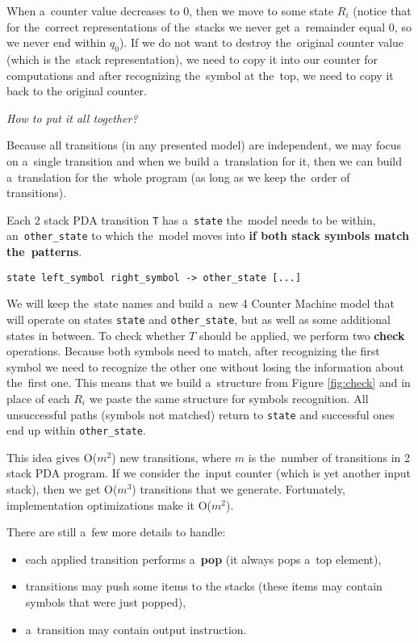 \documentclass[english,shortabstract,mgr]{iithesis}
\begin{document}
When a~counter value decreases to $0$, then we move to some state $R_i$ (notice that for
the~correct representations of the~stacks we never get a~remainder equal $0$, so we never end within $q_0$).
If we do not want to destroy the~original counter value (which is the~stack representation), we need
to copy it into our counter for computations and after recognizing the~symbol at the~top,
we need to copy it back to the original counter.

\textit{How to put it all together?}

Because all transitions (in any presented model) are independent, we may focus on a~single
transition and when we build a~translation for it, then we can build a~translation for the~whole
program (as long as we keep the~order of transitions).

Each 2 stack PDA transition \texttt{T} has a~\texttt{state} the~model needs to be within,
an~\texttt{other\_state} to which the~model moves into \textbf{if both stack symbols match
the~patterns}.

\begin{verbatim}
state left_symbol right_symbol -> other_state [...]
\end{verbatim}

We will keep the~state names and build a~new 4 Counter Machine model that will operate
on states \texttt{state} and \texttt{other\_state}, but as well as some additional states
in between. To check whether $T$ should be applied, we perform two \textbf{check}
operations. Because both symbols need to match, after recognizing the first symbol
we need to recognize the other one without losing the information about the~first one. This
means that we build a~structure from Figure \ref{fig:check} and in place of each $R_i$ we
paste the same structure for symbols recognition. All unsuccessful paths (symbols not matched)
return to \texttt{state} and successful ones end up within \texttt{other\_state}.

This idea gives O($m^2$) new transitions, where $m$ is the~number of transitions in 2 stack PDA
program. If we consider the~input counter (which is yet another input stack), then we get O($m^3$)
transitions that we generate. Fortunately, implementation optimizations make it O($m^2$).

There are still a~few more details to handle:
\begin{itemize}
  \item each applied transition performs a~\textbf{pop} (it always pops a~top element),
  \item transitions may push some items to the stacks (these items may contain symbols that
      were just popped),
  \item a~transition may contain output instruction.
\end{itemize}
\end{document}
